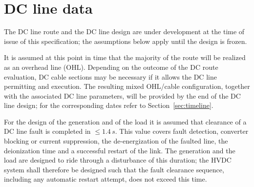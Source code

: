 \section{DC line data}
\label{sec:dc-line-data}

The DC line route and the DC line design are under development at the time of
issue of this specification; the assumptions below apply until the design is
frozen.

It is assumed at this point in time that the majority of the route will be
realized as an overhead line (OHL). Depending on the outcome of the DC route evaluation, DC cable sections may be
necessary if it allows the DC line permitting and execution. The resulting mixed OHL/cable
configuration, together with the associated DC line parameters, will be
provided by the end of the DC line design; for the corresponding dates refer to
Section~\ref{sec:timeline}. 

For the design of the generation and of the load it is assumed that clearance
of a DC line fault is completed in $\le 1.4\,s$. This value
covers fault detection, converter blocking or current suppression, the
de-energization of the faulted line, the deionization time and a successful
restart of the link. The generation and the load are designed to ride through
a disturbance of this duration; the HVDC system shall therefore be designed
such that the fault clearance sequence, including any automatic restart
attempt, does not exceed this time.
